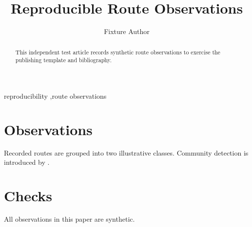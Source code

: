 \documentclass[a4paper,fleqn]{cas-sc}
\begin{document}
\title[mode=title]{Reproducible Route Observations}
\author[1]{Fixture Author}

\begin{abstract}
This independent test article records synthetic route observations to
exercise the publishing template and bibliography.
\end{abstract}
\begin{keywords}
reproducibility \sep route observations
\end{keywords}
\maketitle

\section{Observations}
Recorded routes are grouped into two illustrative classes. Community
detection is introduced by \citet{Fortunato2010}.

\section{Checks}
All observations in this paper are synthetic.



\end{document}
